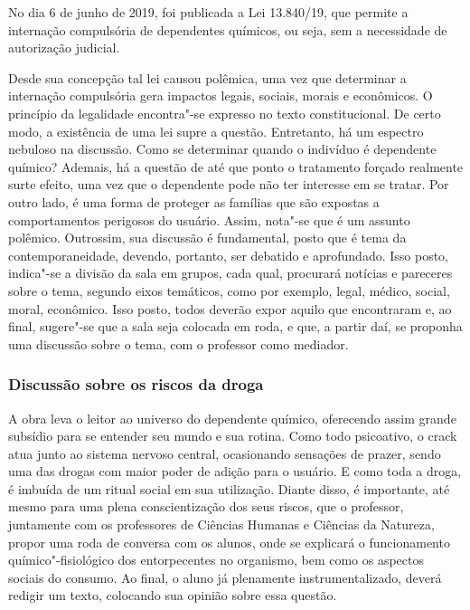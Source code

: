 \documentclass[12pt]{extarticle}
\begin{document}
No dia 6 de junho de 2019, foi publicada a Lei 13.840/19, que permite
a internação compulsória de dependentes químicos, ou seja, sem a
necessidade de autorização judicial.

Desde sua concepção tal lei causou polêmica, uma vez que determinar a
internação compulsória gera impactos legais, sociais, morais e
econômicos. O princípio da legalidade encontra"-se expresso no texto
constitucional. De certo modo, a existência de uma lei supre a questão.
Entretanto, há um espectro nebuloso na discussão. Como se determinar
quando o indivíduo é dependente químico? Ademais, há a questão de até
que ponto o tratamento forçado realmente surte efeito, uma vez que o
dependente pode não ter interesse em se tratar. Por outro lado, é uma
forma de proteger as famílias que são expostas a comportamentos
perigosos do usuário. Assim, nota"-se que é um assunto
polêmico. Outrossim, sua discussão é fundamental, posto que é tema da
contemporaneidade, devendo, portanto, ser debatido e aprofundado. Isso
posto, indica"-se a divisão da sala em grupos, cada qual, procurará
notícias e pareceres sobre o tema, segundo eixos temáticos, como por
exemplo, legal, médico, social, moral, econômico. Isso posto, todos
deverão expor aquilo que encontraram e, ao final, sugere"-se que a sala
seja colocada em roda, e que, a partir daí, se proponha uma discussão
sobre o tema, com o professor como mediador.


\subsubsection{Discussão sobre os riscos da droga}

A obra leva o leitor ao universo do dependente químico, oferecendo
assim grande subsídio para se entender seu mundo e sua rotina. Como
todo psicoativo, o crack atua junto ao sistema nervoso central,
ocasionando sensações de prazer, sendo uma das drogas com maior poder
de adição para o usuário. E como toda a droga, é imbuída de um ritual
social em sua utilização. Diante disso, é importante, até mesmo para
uma plena conscientização dos seus riscos, que o professor, juntamente
com os professores de Ciências Humanas e Ciências da Natureza, propor
uma roda de conversa com os alunos, onde se explicará o funcionamento
químico"-fisiológico dos entorpecentes no organismo, bem como os
aspectos sociais do consumo. Ao final, o aluno já plenamente
instrumentalizado, deverá redigir um texto, colocando sua opinião
sobre essa questão.
\end{document}
